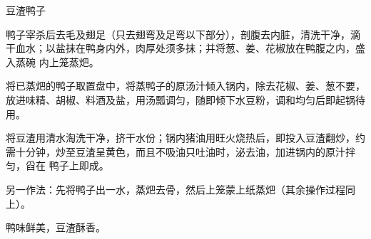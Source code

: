 \begin{recipe}{豆渣鸭子}

\ingredients



\preparation

\step 鸭子宰杀后去毛及翅足（只去翅弯及足弯以下部分），剖腹去内脏，清洗干净，滴
干血水；以盐抹在鸭身内外，肉厚处须多抹；并将葱、姜、花椒放在鸭腹之内，盛入蒸碗
内上笼蒸𤆵。

\step 将已蒸𤆵的鸭子取置盘中，将蒸鸭子的原汤汁倾入锅内，除去花椒、姜、葱不要，
放进味精、胡椒、料酒及盐，用汤瓢调匀，随即倾下水豆粉，调和均匀后即起锅待用。

\step 将豆渣用清水淘洗干净，挤干水份；锅内猪油用旺火烧热后，即投入豆渣翻炒，约
需十分钟，炒至豆渣呈黄色，而且不吸油只吐油时，泌去油，加进锅内的原汁拌匀，舀在
鸭子上即成。

另一作法：先将鸭子出一水，蒸𤆵去骨，然后上笼蒙上纸蒸𤆵（其余操作过程同上）。

\features

鸭味鲜美，豆渣酥香。

\end{recipe}

